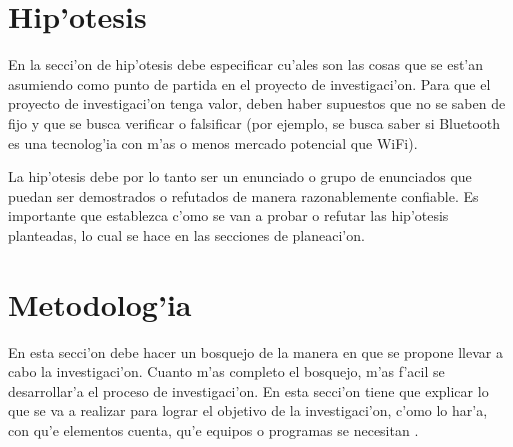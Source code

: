 \section{Hip'otesis}
\noindent
En la secci'on de hip'otesis debe especificar cu'ales son las cosas que se est'an asumiendo como punto de partida en el proyecto de investigaci'on. Para que el proyecto de investigaci'on tenga valor, deben haber supuestos que no se saben de fijo y que se busca verificar o falsificar (por ejemplo, se busca saber si Bluetooth es una tecnolog'ia con m'as o menos mercado potencial que WiFi).

La hip'otesis debe por lo tanto ser un enunciado o grupo de enunciados que puedan ser demostrados o refutados de manera razonablemente confiable. Es importante que establezca c'omo se van a probar o refutar las hip'otesis planteadas, lo cual se hace en las secciones de planeaci'on.

\section{Metodolog'ia}
\noindent
En esta secci'on debe hacer un bosquejo de la manera en que se propone llevar a cabo la investigaci'on. Cuanto m'as completo el bosquejo, m'as f'acil se desarrollar'a el proceso de investigaci'on. En esta secci'on tiene que explicar lo que se va a realizar para lograr el objetivo de la investigaci'on, c'omo lo har'a, con qu'e elementos cuenta, qu'e equipos o programas se necesitan \cite{Demo:tesis_autor}.

\clearpage